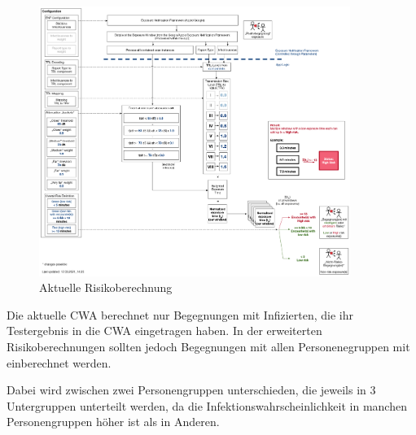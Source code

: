 \documentclass[conference,compsoc]{IEEEtran}
\begin{document}
\begin{figure}[h]
	\centering
	\includegraphics[width=0.9\textwidth]{"Aktuelle_Risikoberechnung"}
	\caption{Aktuelle Risikoberechnung \cite{Risikoberechnung} }
	\label{Risikoberechnung_Abbildung}
\end{figure}

Die aktuelle CWA berechnet nur Begegnungen mit Infizierten, die ihr Testergebnis in die CWA eingetragen haben.
In der erweiterten Risikoberechnungen sollten jedoch Begegnungen mit allen Personenegruppen mit einberechnet werden.

Dabei wird zwischen zwei Personengruppen unterschieden, die jeweils in 3 Untergruppen unterteilt werden, 
da die Infektionswahrscheinlichkeit in manchen Personengruppen höher ist als in Anderen.
\end{document}
